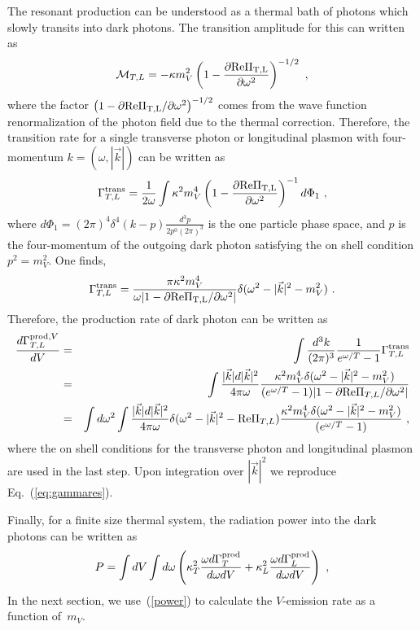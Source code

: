 \documentclass[12pt]{article}
\begin{document}
The resonant production can be  understood as a thermal bath of photons which slowly transits into dark photons. The transition amplitude for this can written as
\begin{equation}
{\cal M}_{T,L} = -\kappa m_V^2 \left(1 - \frac{\partial {\rm Re\Pi_{T,L}}}{\partial \omega^2}\right)^{-1/2} \ ,
\end{equation}
where the factor $\left(1 - \partial {\rm Re\Pi_{T,L}}/\partial \omega^2\right)^{-1/2}$ comes from the wave function renormalization of the photon field due to the thermal correction. Therefore, the transition rate for a single transverse photon or longitudinal plasmon with four-momentum $k = (\omega,|\vec k|)$ can be written as
\begin{eqnarray}
\Gamma^{\rm trans}_{T,L} = \frac{1}{2\omega} \int \kappa^2 m_V^4 \left(1 - \frac{\partial {\rm Re\Pi_{T,L}}}{\partial \omega^2}\right)^{-1} d\Phi_1 \ ,
\end{eqnarray}
where $d\Phi_1 = (2\pi)^4\delta^4(k-p) \frac{d^3p}{2p^0(2\pi)^3}$ is the one particle phase space, and $p$ is the four-momentum of the outgoing dark photon satisfying the on shell condition $p^2 = m_V^2$. One finds,
\begin{equation}
\Gamma^{\rm trans}_{T,L} = \frac{ \pi \kappa^2 m_V^4}{\omega |1 - \partial{\rm Re\Pi_{T,L}}/\partial\omega^2|} \delta(\omega^2 - |\vec k|^2 - m_V^2) \ .
\end{equation}
Therefore, the production rate of dark photon can be written as
\begin{eqnarray}
\frac{d\Gamma_{T,L}^{{\rm prod},V}}{dV} &=& \int\frac{d^3k}{(2\pi)^3} \frac{1}{e^{\omega/T} - 1} \Gamma^{\rm trans}_{T,L} \nonumber \\
&=& \int \frac{|\vec k| d |\vec k|^2}{4\pi\omega} \frac{\kappa^2 m_V^4 \delta(\omega^2 - |\vec k|^2 - m_V^2)}{(e^{\omega/T} - 1)|1-\partial {\rm Re\Pi}_{T,L}/\partial\omega^2|}  \nonumber \\
&=& \int d\omega^2 \int \frac{|\vec k| d |\vec k|^2}{4\pi\omega} \delta(\omega^2 - |\vec k|^2 - {\rm Re\Pi}_{T,L})\frac{\kappa^2 m_V^4 \delta(\omega^2 - |\vec k|^2 - m_V^2)}{(e^{\omega/T} - 1)} \ ,
\end{eqnarray}
where the on shell conditions for the transverse photon and longitudinal plasmon are used in the last step. Upon integration over $|\vec k|^2$ we reproduce Eq.~(\ref{eq:gammares}).   

Finally, for a finite size thermal system, the radiation power into the dark photons can be written as
\begin{equation}
\label{power}
P = \int dV \int d\omega \left(\kappa_T^2 \frac{\omega d\Gamma^{\rm prod}_{T}}{d\omega dV} + \kappa_L^2 \frac{\omega d\Gamma^{\rm prod}_{L}}{d\omega dV}\right) \ ,
\end{equation}
In the next section, we use~(\ref{power}) to calculate the
$V$-emission rate as a function of~$m_V$.
\end{document}
